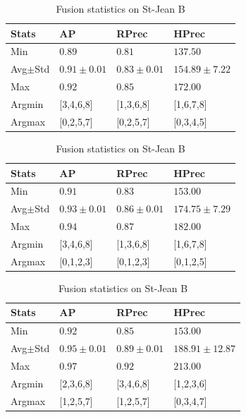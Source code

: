 \begin{table}
  \centering
  \caption{Fusion statistics on St-Jean B}
  \label{tab:fusion_stats_B}

  \begin{tabular}{l l l l}
    \toprule
    Stats
    & AP
    & RPrec
    & HPrec \\
    \midrule
    Min & $0.89$ & $0.81$ & $137.50$ \\
    Avg$\pm$Std & $0.91\pm0.01$ & $0.83\pm0.01$ & $154.89\pm7.22$ \\
    Max & $0.92$ & $0.85$ & $172.00$ \\
    Argmin & [3,4,6,8] & [1,3,6,8] & [1,6,7,8] \\
    Argmax & [0,2,5,7] & [0,2,5,7] & [0,3,4,5] \\
    \bottomrule
  \end{tabular}

  \vspace{0.5cm}

  \begin{tabular}{l l l l}
    \toprule
    Stats
    & AP
    & RPrec
    & HPrec \\
    \midrule
    Min & $0.91$ & $0.83$ & $153.00$ \\
    Avg$\pm$Std & $0.93\pm0.01$ & $0.86\pm0.01$ & $174.75\pm7.29$ \\
    Max & $0.94$ & $0.87$ & $182.00$ \\
    Argmin & [3,4,6,8] & [1,3,6,8] & [1,6,7,8] \\
    Argmax & [0,1,2,3] & [0,1,2,3] & [0,1,2,5] \\
    \bottomrule
  \end{tabular}

  \vspace{0.5cm}

  \begin{tabular}{l l l l}
    \toprule
    Stats
    & AP
    & RPrec
    & HPrec \\
    \midrule
    Min & $0.92$ & $0.85$ & $153.00$ \\
    Avg$\pm$Std & $0.95\pm0.01$ & $0.89\pm0.01$ & $188.91\pm12.87$ \\
    Max & $0.97$ & $0.92$ & $213.00$ \\
    Argmin & [2,3,6,8] & [3,4,6,8] & [1,2,3,6] \\
    Argmax & [1,2,5,7] & [1,2,5,7] & [0,3,4,7] \\
    \bottomrule
  \end{tabular}


\end{table}
